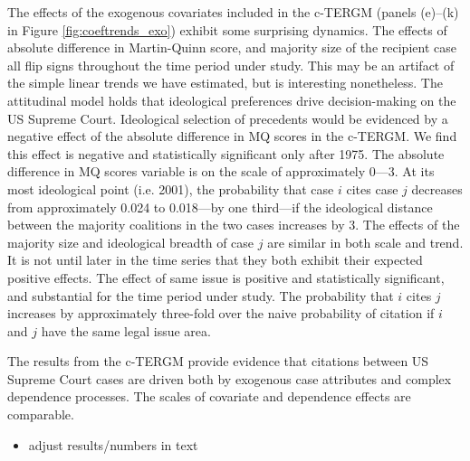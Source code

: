 \documentclass[headsepline=true, abstracton]{scrartcl}
\begin{document}
The effects of the exogenous covariates included in the c-TERGM (panels (e)--(k) in Figure \ref{fig:coeftrends_exo}) exhibit some surprising dynamics. The effects of absolute difference in Martin-Quinn score, and majority size of the recipient case all flip signs throughout the time period under study. This may be an artifact of the simple linear trends we have estimated, but is interesting nonetheless. The attitudinal model holds that ideological preferences drive decision-making on the US Supreme Court. Ideological selection of precedents would be evidenced by a negative effect of the absolute difference in MQ scores in the c-TERGM. We find this effect is negative and statistically significant only after 1975. The absolute difference in MQ scores variable is on the scale of approximately 0---3. At its most ideological point (i.e. 2001), the probability that case $i$ cites case $j$ decreases from approximately 0.024 to 0.018---by one third---if the ideological distance between the majority coalitions in the two cases increases by 3. The effects of the majority size and ideological breadth of case $j$ are similar in both scale and trend. It is not until later in the time series that they both exhibit their expected positive effects. The effect of same issue is positive and statistically significant, and substantial for the time period under study. The probability that $i$ cites $j$ increases by approximately three-fold over the naive probability of citation if $i$ and $j$ have the same legal issue area.

The results from the c-TERGM provide evidence that citations between US Supreme Court cases are driven both by exogenous case attributes and complex dependence processes. The scales of covariate and dependence effects are comparable. 


\begin{itemize}
\item adjust results/numbers in text
\end{itemize}
\end{document}

